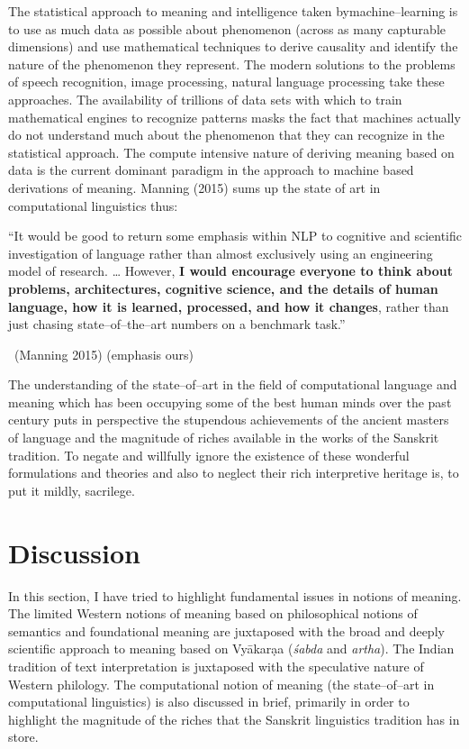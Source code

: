 The statistical approach to meaning and intelligence taken by\break machine–learning is to use as much data as possible about phenomenon (across as many capturable dimensions) and use mathematical techniques to derive causality and identify the nature of the phenomenon they represent. The modern solutions to the problems of speech recognition, image processing, natural language processing take these approaches. The availability of trillions of data sets with which to train mathematical engines to recognize patterns masks the fact that machines actually do not understand much about the phenomenon that they can recognize in the statistical approach. The compute intensive nature of deriving meaning based on data is the current dominant paradigm in the approach to machine based derivations of meaning. Manning (2015) sums up the state of art in computational linguistics thus:

\begin{myquote}
“It would be good to return some emphasis within NLP to cognitive and scientific investigation of language rather than almost exclusively using an engineering model of research. … However, \textbf{I would encourage everyone to think about problems, architectures, cognitive science, and the details of human language, how it is learned, processed, and how it changes}, rather than just chasing state–of–the–art numbers on a benchmark task.”

~\hfill (Manning 2015) (emphasis ours)
\end{myquote}

The understanding of the state–of–art in the field of computational language and meaning which has been occupying some of the best human minds over the past century puts in perspective the stupendous achievements of the ancient masters of language and the magnitude of riches available in the works of the Sanskrit tradition. To negate and willfully ignore the existence of these wonderful formulations and theories and also to neglect their rich interpretive heritage is, to put it mildly, sacrilege.


\section*{Discussion}

\vskip -7pt

In this section, I have tried to highlight fundamental issues in notions of meaning. The limited Western notions of meaning based on philosophical notions of semantics and foundational meaning are juxtaposed with the broad and deeply scientific approach to meaning based on Vyākarạa (\textit{śabda} and \textit{artha}). The Indian tradition of text interpretation is juxtaposed with the speculative nature of Western philology. The computational notion of meaning (the state–of–art in computational linguistics) is also discussed in brief, primarily in order to highlight the magnitude of the riches that the Sanskrit linguistics tradition has in store.

